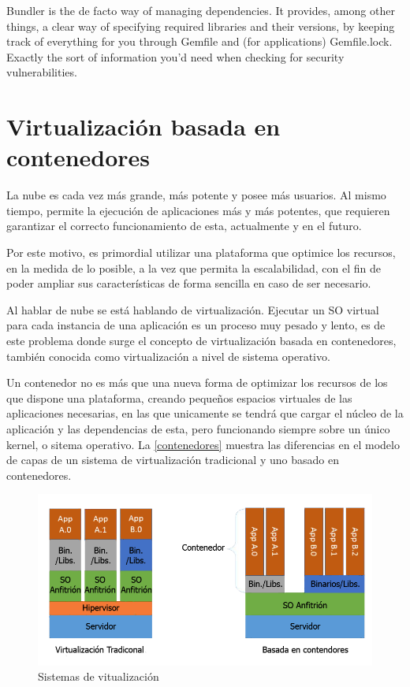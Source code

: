 

Bundler is the de facto way of managing dependencies. It provides, among other things, a clear way of specifying required libraries and their versions, by keeping track of everything for you through Gemfile and (for applications) Gemfile.lock. Exactly the sort of information you’d need when checking for security vulnerabilities.

\section{Virtualización basada en contenedores}

La nube es cada vez más grande, más potente y posee más usuarios. Al mismo tiempo, permite la ejecución de aplicaciones más y más potentes, que requieren garantizar el correcto funcionamiento de esta, actualmente y en el futuro.

Por este motivo, es primordial utilizar una plataforma que optimice los recursos, en la medida de lo posible, a la vez que permita la escalabilidad, con el fin de poder ampliar sus características de forma sencilla en caso de ser necesario.

Al hablar de nube se está hablando de virtualización. Ejecutar un \gls{SO} virtual para cada instancia de una aplicación es un proceso muy pesado y lento, es de este problema donde surge el concepto de virtualización basada en contenedores, también conocida como virtualización a nivel de sistema operativo.

Un contenedor no es más que una nueva forma de optimizar los recursos de los que dispone una plataforma, creando pequeños espacios virtuales de las aplicaciones necesarias, en las que unicamente se tendrá que cargar el núcleo de la aplicación y las dependencias de esta, pero funcionando siempre sobre un único kernel, o sitema operativo\cite{velazco2016}. La \autoref{contenedores} muestra las diferencias en el modelo de capas de un sistema de virtualización tradicional y uno basado en contenedores.

\begin{figure}[htbp]
	\centering
	\includegraphics[width=0.8\linewidth]
	{tecnica/figuras/Contenedores.png}
	\caption{Sistemas de vitualización}
	\label{contenedores}
\end{figure}



\endinput